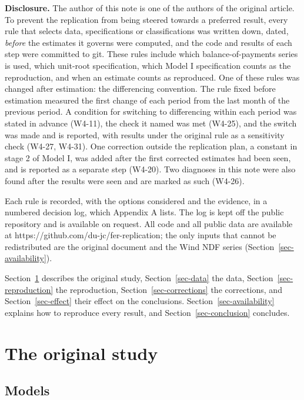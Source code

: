\documentclass[
  12pt,
  a4paper,
]{article}
\begin{document}
\textbf{Disclosure.} The author of this note is one of the authors of
the original article. To prevent the replication from being steered
towards a preferred result, every rule that selects data, specifications
or classifications was written down, dated, \emph{before} the estimates
it governs were computed, and the code and results of each step were
committed to git. These rules include which balance-of-payments series
is used, which unit-root specification, which Model I specification
counts as the reproduction, and when an estimate counts as reproduced.
One of these rules was changed after estimation: the differencing
convention. The rule fixed before estimation measured the first change
of each period from the last month of the previous period. A condition
for switching to differencing within each period was stated in advance
(W4-11), the check it named was met (W4-25), and the switch was made and
is reported, with results under the original rule as a sensitivity check
(W4-27, W4-31). One correction outside the replication plan, a constant
in stage 2 of Model I, was added after the first corrected estimates had
been seen, and is reported as a separate step (W4-20). Two diagnoses in
this note were also found after the results were seen and are marked as
such (W4-26).

Each rule is recorded, with the options considered and the evidence, in
a numbered decision log, which Appendix A lists. The log is kept off the
public repository and is available on request. All code and all public
data are available at https://github.com/du-jc/fer-replication; the only
inputs that cannot be redistributed are the original document and the
Wind NDF series (Section~\ref{sec-availability}).

Section~\ref{sec-original} describes the original study,
Section~\ref{sec-data} the data, Section~\ref{sec-reproduction} the
reproduction, Section~\ref{sec-corrections} the corrections, and
Section~\ref{sec-effect} their effect on the conclusions.
Section~\ref{sec-availability} explains how to reproduce every result,
and Section~\ref{sec-conclusion} concludes.

\section{The original study}\label{sec-original}

\subsection{Models}\label{models}
\end{document}
